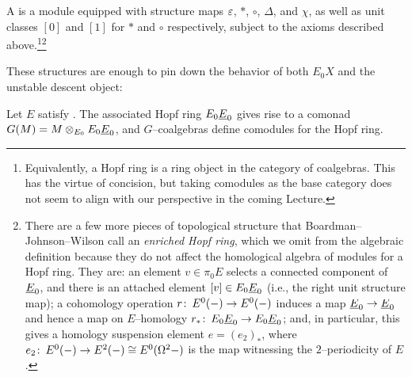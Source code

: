 \begin{definition}
A  is a module equipped with structure maps \(\varepsilon\), \(\ast\), \(\circ\), \(\Delta\), and \(\chi\), as well as unit classes \([0]\) and \([1]\) for \(\ast\) and \(\circ\) respectively, subject to the axioms described above.\footnote{Equivalently, a Hopf ring is a ring object in the category of coalgebras.  This has the virtue of concision, but taking comodules as the base category does not seem to align with our perspective in the coming Lecture.}\footnote{There are a few more pieces of topological structure that Boardman--Johnson--Wilson call an \textit{enriched Hopf ring}, which we omit from the algebraic definition because they do not affect the homological algebra of modules for a Hopf ring.  They are: an element \(v \in \pi_0 E\) selects a connected component of \(\underline{\smash{E}}_{0}\), and there is an attached element \([v] \in E_0 \underline{\smash{E}}_{0}\) (i.e., the right unit structure map); a cohomology operation \(r\colon\thinspace E^0(-) \to E^0(-)\) induces a map \(\underline{\smash{E}}_{0} \to \underline{\smash{E}}_{0}\) and hence a map on \(E\)--homology \(r_*\colon\thinspace E_0 \underline{\smash{E}}_{0} \to E_0 \underline{\smash{E}}_{0}\); and, in particular, this gives a homology suspension element \(e = (e_2)_*\), where \(e_2\colon\thinspace E^0(-) \to E^2(-) \cong E^0(\Omega^2 -)\) is the map witnessing the \(2\)--periodicity of \(E\).}
\end{definition}

These structures are enough to pin down the behavior of both \(E_0 X\) and the unstable descent object:

\begin{definition}
Let \(E\) satisfy {\UFH}.  The associated Hopf ring \(E_0 \underline{\smash{E}}_{0}\) gives rise to a comonad \(G(M) = M \otimes_{E_0} E_0 \underline{\smash{E}}_{0}\), and \(G\)--coalgebras define comodules for the Hopf ring.
\end{definition}

